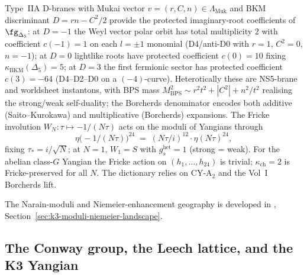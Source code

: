 \begin{conjecture}
\label{conj:k3-dbrane-bkm}
\ClaimStatusConjectured
Type~IIA D-branes with Mukai vector $v=(r,C,n)\in\Lambda_{\mathrm{Muk}}$
and BKM discriminant $D=rn-C^2/2$ provide the protected
imaginary-root coefficients of $\fg_{\Delta_5}$: at $D=-1$ the Weyl
vector polar orbit has total multiplicity $2$ with coefficient
$c(-1)=1$ on each $l=\pm1$ monomial (D4/anti-D0 with $r=1$,
$C^2=0$, $n=-1$); at $D=0$ lightlike roots have protected coefficient
$c(0)=10$ fixing $\kappa_{\mathrm{BKM}}(\Delta_5)=5$; at $D=3$ the first
fermionic sector has protected coefficient $c(3)=-64$ (D4--D2--D0 on
a $(-4)$-curve).
Heterotically these are NS5-brane and worldsheet instantons, with BPS
mass $M_{\mathrm{BPS}}^2\sim r^2 t^2 + |C^2| + n^2/t^2$ realising the
strong/weak self-duality; the Borcherds denominator encodes both additive
(Saito--Kurokawa) and multiplicative (Borcherds) expansions. The Fricke
involution $W_N\colon\tau\mapsto -1/(N\tau)$ acts on the moduli of
Yangians through
\begin{equation}\label{eq:fricke-eta}
 \eta\bigl(-1/(N\tau)\bigr)^{24} \;=\; (N\tau/i)^{12}\cdot\eta(N\tau)^{24},
\end{equation}
fixing $\tau_*=i/\sqrt{N}$; at $N=1$, $W_1=S$ with $g_s^{\mathrm{het}}=1$
(strong = weak). For the abelian class-$G$ Yangian the Fricke action on
$(h_1,\ldots,h_{24})$ is trivial; $\kappa_{\mathrm{ch}}=2$ is
Fricke-preserved for all $N$. The dictionary relies on CY-A$_2$ and the
Vol~I Borcherds lift.
\end{conjecture}

The Narain-moduli and Niemeier-enhancement geography is developed in
\cite{VolI},
Section~\ref{sec:k3-moduli-niemeier-landscape}.



\subsection{The Conway group, the Leech lattice, and the K3 Yangian}
\label{subsec:conway-leech-k3}

